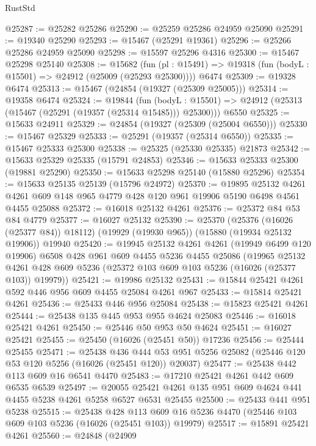 \begin{lexlean}{RustStd}
\begin{coremodule}
@25287 := @25282 @25286
@25290 := @25259 @25286 @24959 @25090
@25291 := @19340 @25290
@25293 := @15467 (@25291 @19361)
@25296 := @25266 @25286 @24959 @25090
@25298 := @15597 @25296 @4316
@25300 := @15467 @25298 @25140
@25308 := @15682
    (fun (pl : @15491) => @19318 (fun (bodyL : @15501) => @24912 (@25009 (@25293 @25300))))
    @6474
@25309 := @19328 @6474
@25313 := @15467 (@24854 (@19327 (@25309 @25005)))
@25314 := @19358 @6474
@25324 := @19844
    (fun (bodyL : @15501) => @24912 (@25313 (@15467 (@25291 (@19357 (@25314 @15485))) @25300)))
    @6550
@25325 := @15633 @24911
@25329 := @24854 (@19327 (@25309 (@25004 @6550)))
@25330 := @15467 @25329
@25333 := @25291 (@19357 (@25314 @6550))
@25335 := @15467 @25333 @25300
@25338 := @25325 (@25330 @25335) @21873
@25342 := @15633 @25329 @25335 (@15791 @24853)
@25346 := @15633 @25333 @25300 (@19881 @25290)
@25350 := @15633 @25298 @25140 (@15880 @25296)
@25354 := @15633 @25135 @25139 (@15796 @24972)
@25370 := @19895
    @25132
    @4261
    @4261
    @609
    @148
    @965
    @4779
    @428
    @120
    @961
    @19906
    @5190
    @6498
    @4561
    @4455
    @25088
@25372 := @16018 @25132 @4261
@25376 := @25372 @84 @53 @84 @4779
@25377 := @16027 @25132
@25390 := @25370
    (@25376 (@16026 (@25377 @84)) @18112)
    (@19929 (@19930 @965))
    (@15880 (@19934 @25132 @19906))
    @19940
@25420 := @19945
    @25132
    @4261
    @4261
    (@19949 @6499 @120 @19906)
    @6508
    @428
    @961
    @609
    @4455
    @5236
    @4455
    @25086
    (@19965
      @25132
      @4261
      @428
      @609
      @5236
      (@25372 @103 @609 @103 @5236 (@16026 (@25377 @103)) @19979))
@25421 := @19986 @25132
@25431 := @15844 @25421 @4261 @592 @446 @956 @609 @4455 @25084 @4261 @967
@25433 := @15814 @25421 @4261
@25436 := @25433 @446 @956 @25084
@25438 := @15823 @25421 @4261
@25444 := @25438 @135 @445 @953 @955 @4624 @25083
@25446 := @16018 @25421 @4261
@25450 := @25446 @50 @953 @50 @4624
@25451 := @16027 @25421
@25455 := @25450 (@16026 (@25451 @50)) @17236
@25456 := @25444 @25455
@25471 := @25438
    @436
    @444
    @53
    @951
    @5256
    @25082
    (@25446 @120 @53 @120 @5256 (@16026 (@25451 @120)) @20037)
@25477 := @25438 @442 @113 @609 @16 @6541 @4470
@25483 := @17210 @25421 @4261 @442 @609 @6535 @6539
@25497 := @20055 @25421 @4261 @135 @951 @609 @4624 @441 @4455 @5238 @4261 @5258 @6527 @6531 @25455
@25500 := @25433 @441 @951 @5238
@25515 := @25438
    @428
    @113
    @609
    @16
    @5236
    @4470
    (@25446 @103 @609 @103 @5236 (@16026 (@25451 @103)) @19979)
@25517 := @15891 @25421 @4261
@25560 := @24848
    (@24909

\end{coremodule}
\end{lexlean}
